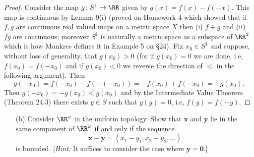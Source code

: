 \begin{proof}
Consider the map $g\colon S^1\to\RR$ given by
$g(x)=f(x)-f(-x)$. This map is continuous by Lemma 9(i) (proved on
Homework 4 which showed that if $f,g$ are continuous real valued maps on a
metric space $X$ then (i) $f+g$ and (ii) $fg$ are continuous;
moreover $S^1$ is naturally a metric space as a subspace of
$\RR^2$ which is how Munkres defines it in Example 5 on
\S24). Fix $x_0\in S^1$ and suppose, without loss of generality,
that $g(x_0)>0$ (for if $g(x_0)=0$ we are done, i.e,
$f(x_0)=f(-x_0)$ and if $g(x_0)<0$ we reverse the direction of
$<$ in the following argument). Then
\[
g(-x_0)=f(-x_0)-f(-(-x_0))=-f(x_0)+f(-x_0)=-g(x_0).
\]
Then $g(-x_0)=-g(x_0)<g(x_0)$ and by the Intermediate Value
Theorem (Theorem 24.3) there exists $y\in S$ such that $g(y)=0$,
i.e, $f(y)=f(-y)$.
\end{proof}
\newpage
\begin{problem}[Munkres \S25, Ex.\,2(b)]
\begin{enumerate}[noitemsep]
\item[(b)] Consider $\RR^\omega$ in the uniform topology. Show
  that $\mathbf{x}$ and $\mathbf{y}$ lie in the same component of
  $\RR^\omega$ if and only if the sequence
  \[
    \mathbf{x}-\mathbf{y}=(x_1-y_1,x_2-y_2,...)
  \]
  is bounded. [\emph{Hint:} It suffices to consider the case
  where $\mathbf{y}=\mathbf{0}$.]
\end{enumerate}
\end{problem}
